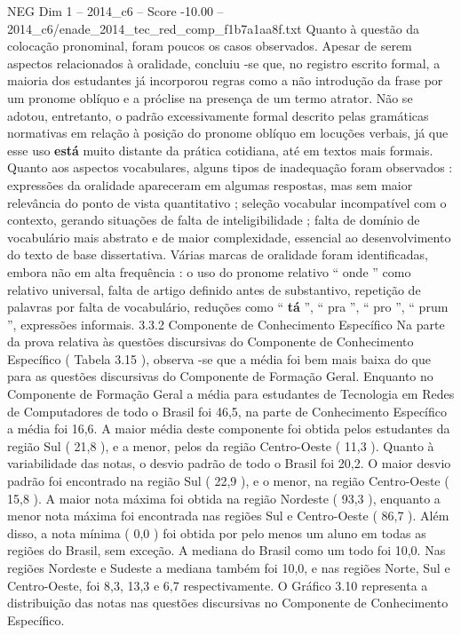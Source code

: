 \begin{textsample}{NEG Dim 1 – 2014\_c6 – Score -10.00 – 2014\_c6/enade\_2014\_tec\_red\_comp\_f1b7a1aa8f.txt}
Quanto à questão da colocação pronominal, foram poucos os casos observados.
Apesar de serem aspectos relacionados à oralidade, concluiu -se que, no registro escrito formal, a maioria dos estudantes já incorporou regras como a não introdução da frase por um pronome oblíquo e a próclise na presença de um termo atrator.
Não se adotou, entretanto, o padrão excessivamente formal descrito pelas gramáticas normativas em relação à posição do pronome oblíquo em locuções verbais, já que esse uso \textbf{está} muito distante da prática cotidiana, até em textos mais formais.
Quanto aos aspectos vocabulares, alguns tipos de inadequação foram observados : expressões da oralidade apareceram em algumas respostas, mas sem maior relevância do ponto de vista quantitativo ; seleção vocabular incompatível com o contexto, gerando situações de falta de inteligibilidade ; falta de domínio de vocabulário mais abstrato e de maior complexidade, essencial ao desenvolvimento do texto de base dissertativa.
Várias marcas de oralidade foram identificadas, embora não em alta frequência : o uso do pronome relativo “ onde ” como relativo universal, falta de artigo definido antes de substantivo, repetição de palavras por falta de vocabulário, reduções como “ \textbf{tá} ”, “ pra ”, “ pro ”, “ prum ”, expressões informais. 3.3.2 Componente de Conhecimento Específico Na parte da prova relativa às questões discursivas do Componente de Conhecimento Específico ( Tabela 3.15 ), observa -se que a média foi bem mais baixa do que para as questões discursivas do Componente de Formação Geral.
Enquanto no Componente de Formação Geral a média para estudantes de Tecnologia em Redes de Computadores de todo o Brasil foi 46,5, na parte de Conhecimento Específico a média foi 16,6.
A maior média deste componente foi obtida pelos estudantes da região Sul ( 21,8 ), e a menor, pelos da região Centro-Oeste ( 11,3 ).
Quanto à variabilidade das notas, o desvio padrão de todo o Brasil foi 20,2.
O maior desvio padrão foi encontrado na região Sul ( 22,9 ), e o menor, na região Centro-Oeste ( 15,8 ).
A maior nota máxima foi obtida na região Nordeste ( 93,3 ), enquanto a menor nota máxima foi encontrada nas regiões Sul e Centro-Oeste ( 86,7 ).
Além disso, a nota mínima ( 0,0 ) foi obtida por pelo menos um aluno em todas as regiões do Brasil, sem exceção.
A mediana do Brasil como um todo foi 10,0.
Nas regiões Nordeste e Sudeste a mediana também foi 10,0, e nas regiões Norte, Sul e Centro-Oeste, foi 8,3, 13,3 e 6,7 respectivamente.
O Gráfico 3.10 representa a distribuição das notas nas questões discursivas no Componente de Conhecimento Específico.

\end{textsample}
